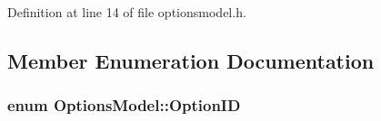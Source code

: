 Definition at line 14 of file optionsmodel.\+h.



\subsection{Member Enumeration Documentation}
\hypertarget{class_options_model_a5c6c9ca8a01aca9f53e91f118e4878d2}{}
\subsubsection[{Option\+I\+D}]{\setlength{\rightskip}{0pt plus 5cm}enum {\bf Options\+Model\+::\+Option\+I\+D}}\label{class_options_model_a5c6c9ca8a01aca9f53e91f118e4878d2}
